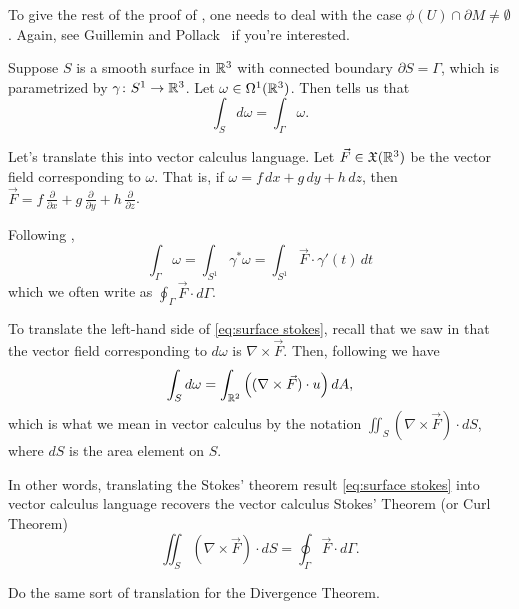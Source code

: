 To give the rest of the proof of , one needs to deal with the case $\phi(U) \cap \partial M \neq \emptyset$. Again, see Guillemin and Pollack~\cite{guilleminDifferentialTopology2010} if you're interested.

\begin{example}
	Suppose $S$ is a smooth surface in $\mathbb{R}^3$ with connected boundary $\partial S = \Gamma$, which is parametrized by $\gamma \colon\thinspace\! S^1 \to \mathbb{R}^3$. Let $\omega \in \Omega^1(\mathbb{R}^3)$. Then  tells us that
	\begin{equation}\label{eq:surface stokes}
		\int_S d\omega = \int_\Gamma \omega.
	\end{equation}
	
	Let's translate this into vector calculus language. Let $\vec{F} \in \mathfrak{X}(\mathbb{R}^3)$ be the vector field corresponding to $\omega$. That is, if $\omega = f \, dx + g \, dy + h\, dz$, then $\vec{F} = f\,\frac{\partial}{\partial x} + g\, \frac{\partial}{\partial y} + h \, \frac{\partial}{\partial z}$. 
	
	Following ,
	\[
		\int_\Gamma \omega = \int_{S^1} \gamma^\ast \omega = \int_{S^1} \vec{F} \cdot \gamma'(t)\, dt
	\]
	which we often write as $\oint_\Gamma \vec{F} \cdot d\Gamma$.
	
	To translate the left-hand side of \eqref{eq:surface stokes}, recall that we saw in  that the vector field corresponding to $d \omega$ is $\nabla \times \vec{F}$. Then, following  we have
	\[
		\int_S d\omega = \int_{\mathbb{R}^2} \left((\nabla \times \vec{F}) \cdot u\right) dA,
	\]
	which is what we mean in vector calculus by the notation $\iint_S (\nabla \times\vec{F}) \cdot dS$, where $dS$ is the area element on $S$. 
	
	In other words, translating the Stokes' theorem result \eqref{eq:surface stokes} into vector calculus language recovers the vector calculus Stokes' Theorem (or Curl Theorem)
	\[
		\iint_S (\nabla \times\vec{F}) \cdot dS = \oint_\Gamma \vec{F} \cdot d\Gamma.
	\]
\end{example}

\begin{exercise}
	Do the same sort of translation for the Divergence Theorem.
\end{exercise}